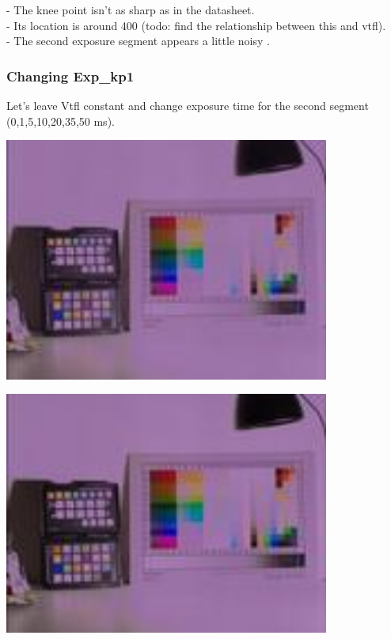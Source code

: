 - The knee point isn't as sharp as in the datasheet.\\
- Its location is around 400 (todo: find the relationship between this and vtfl).\\
- The second exposure segment appears a little noisy .\\

\subsubsection{Changing Exp\_kp1}

Let's leave Vtfl constant and change exposure time for the second segment (0,1,5,10,20,35,50 ms). 

\begin{center}
\includegraphics[height=8cm]{images/100ms-0ms-32-tiny}
\end{center}

\begin{center}
\includegraphics[height=8cm]{images/100ms-1ms-32-tiny}
\end{center}

